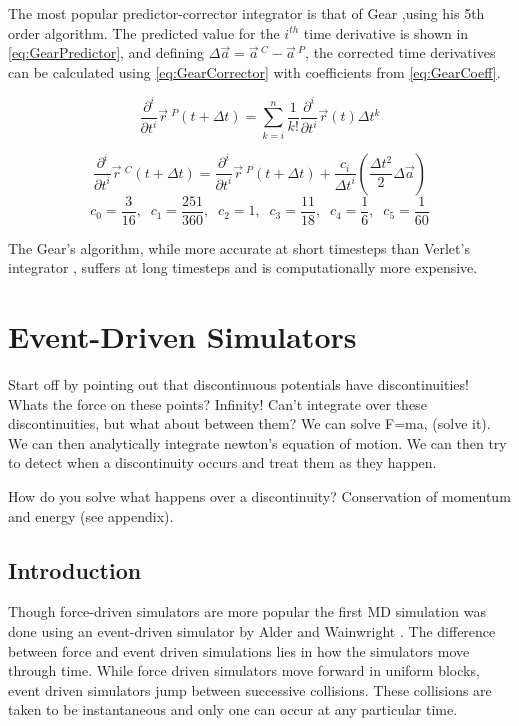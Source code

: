 \documentclass[12pt]{UoAthesis}
\begin{document}
The most popular predictor-corrector integrator is that of Gear
\cite{Gear1971},using his 5th order algorithm. The predicted value for
the $i^{th}$ time derivative is shown in \eqref{eq:GearPredictor}, and
defining $\Delta \vec{a} = \vec{a}\,^{C} - \vec{a}\,^{P}$, the
corrected time derivatives can be calculated using
\eqref{eq:GearCorrector} with coefficients from \eqref{eq:GearCoeff}.

\begin{equation} 
  \frac{\partial^{i}}{\partial t^{i}} \vec{r}\:^{P}(t+\Delta t)
  =\sum^{n}_{k=i} \frac{1}{k!}\frac{\partial^{i} }{\partial t^{i}}
  \vec{r}(t) \Delta t^{k} 
  \label{eq:GearPredictor} 
\end{equation}

\begin{equation} 
  \frac{\partial^{i}}{\partial t^{i}} \vec{r}\:^{C}(t+\Delta t)
  =\frac{\partial^{i} }{\partial t^{i}} \vec{r}\:^{P}(t+\Delta t)
  +\frac{c_i}{\Delta t^i} \left(\frac{\Delta t^2}{2}\Delta \vec{a}\right)
  \label{eq:GearCorrector} \end{equation} \begin{equation} c_0 =
  \frac{3}{16},\;\;c_1 = \frac{251}{360},\;\; c_2 = 1,\;\; c_3 =
  \frac{11}{18},\;\; c_4 =
  \frac{1}{6},\;\; c_5 = \frac{1}{60} \label{eq:GearCoeff} 
\end{equation}

The Gear's algorithm, while more accurate at short timesteps than Verlet's
integrator \cite{Haile1997}, suffers at long timesteps and is computationally
more expensive.
\newpage
\section{Event-Driven Simulators} 
Start off by pointing out that discontinuous potentials have
discontinuities! Whats the force on these points? Infinity! Can't
integrate over these discontinuities, but what about between them? We
can solve F=ma, (solve it). We can then analytically integrate
newton's equation of motion. We can then try to detect when a
discontinuity occurs and treat them as they happen.

How do you solve what happens over a discontinuity? Conservation of
momentum and energy (see appendix).

\subsection{Introduction} 
Though force-driven simulators are more popular the first MD
simulation was done using an event-driven simulator by Alder and
Wainwright \cite{Alder1959}. The difference between force and event
driven simulations lies in how the simulators move through time.
While force driven simulators move forward in uniform blocks, event
driven simulators jump between successive collisions.  These
collisions are taken to be instantaneous and only one can occur at any
particular time.
\end{document}
